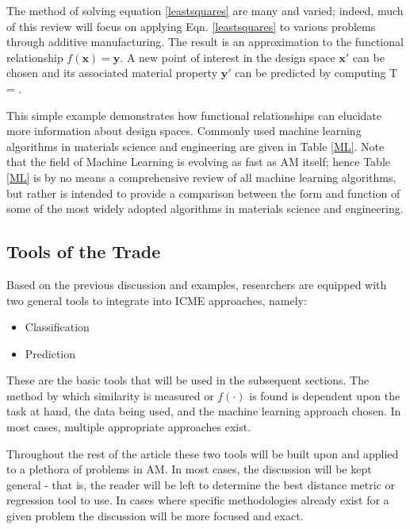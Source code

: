 
The method of solving equation \ref{leastsquares} are many and varied; indeed, much of this review will focus on applying Eqn. \ref{leastsquares} to various problems through additive manufacturing. The result is an approximation to the functional relationship $f(\mathbf{x}) = \mathbf{y}$. A new point of interest in the design space $\mathbf{x'}$ can be chosen and its associated material property $\mathbf{y'}$ can be predicted by computing
\eqn
{}T = .
\equ

This simple example demonstrates how functional relationships can elucidate more information about design spaces. Commonly used machine learning algorithms in materials science and engineering are given in Table \ref{ML}. Note that the field of Machine Learning is evolving as fast as AM itself; hence Table \ref{ML} is by no means a comprehensive review of all machine learning algorithms, but rather is intended to provide a comparison between the form and function of some of the most widely adopted algorithms in materials science and engineering. 



\subsection{Tools of the Trade}
Based on the previous discussion and examples, researchers are equipped with two general tools to integrate into ICME approaches, namely: 
\begin{itemize}
	\item Classification
	\item Prediction
\end{itemize}
These are the basic tools that will be used in the subsequent sections. The method by which similarity is measured or $f(\cdot)$ is found is dependent upon the task at hand, the data being used, and the machine learning approach chosen. In most cases, multiple appropriate approaches exist. 

Throughout the rest of the article these two tools will be built upon and applied to a plethora of problems in AM. In most cases, the discussion will be kept general - that is, the reader will be left to determine the best distance metric or regression tool to use. In cases where specific methodologies already exist for a given problem the discussion will be more focused and exact.

